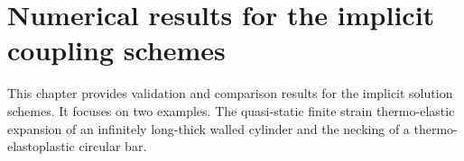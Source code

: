 \chapter{Numerical results for the implicit coupling schemes}

This chapter provides validation and comparison results for the implicit solution schemes.
It focuses on two examples.
The quasi-static finite strain thermo-elastic expansion of an infinitely long-thick walled cylinder and the necking of a thermo-elastoplastic circular bar.

%
%
%
%
